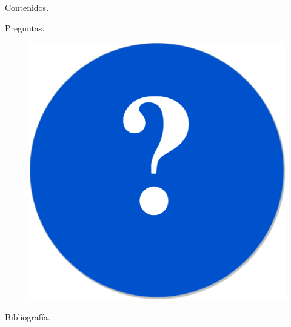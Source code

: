 \documentclass{beamer}
\begin{document}


\begin{frame}[t]{Contenidos}{\textcolor{UniBlue}{.}}
	\tableofcontents
\end{frame}








\begin{frame}{Preguntas}{\textcolor{UniBlue}{.}}
\begin{figure}
  \center
    \includegraphics[scale=0.25]{images/Questions.pdf}
\end{figure}
\end{frame}

\backupbegin
\begin{frame}[allowframebreaks]{Bibliografía}{\textcolor{UniBlue}{.}}
    
    
\end{frame}
\backupend

\appendix




\end{document}

